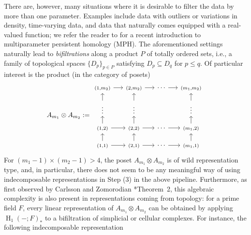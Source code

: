 \documentclass[a4paper]{amsart}
\theoremstyle{plain}
\theoremstyle{definition}
\theoremstyle{remark}
\begin{document}
There are, however, many situations where it is desirable to filter the data by more than one parameter. Examples include data with outliers or variations in density, time-varying data, and data that naturally comes equipped with a real-valued function; we refer the reader to \cite{botnan2022introduction} for a recent introduction to multiparameter persistent homology (MPH). The aforementioned settings naturally lead to \emph{bifiltrations} along a product $P$ of totally ordered sets, i.e., a family of topological spaces $\{D_p\}_{p\in P}$ satisfying $D_p\subseteq D_q$ for $p\leq q$. Of particular interest is the product (in the category of posets)
\[
A_{m_1}\otimes A_{m_2} :=
\begin{tikzcd}[row sep=4mm, column sep=5mm]
\scriptstyle (1, m_2) \ar[r] & \scriptstyle (2, m_2) \ar[r] &  \cdots\ar[r] & \scriptstyle (m_1, m_2) \\
\vdots \ar[u] & \vdots \ar[u] && \vdots \ar[u] \\
\scriptstyle (1,2) \ar[r]  \ar[u] & \scriptstyle (2,2) \ar[u]\ar[r] & \cdots \ar[r] & \scriptstyle (m_1, 2) \ar[u] \\
\scriptstyle (1,1) \ar[r]  \ar[u] & \scriptstyle (2,1) \ar[u]\ar[r] & \cdots \ar[r] & \scriptstyle (m_1, 1) \ar[u] 
\end{tikzcd}
\]
For
$(m_1-1) \times (m_2-1) > 4$, 
the poset
$A_{m_1}\otimes A_{m_2}$ 
is of wild representation type, and, in particular, there does not seem to be any meaningful way of using indecomposable representations in Step (3) in the above pipeline. Furthermore, as first observed by Carlsson and Zomorodian \cite{carlsson2007theory}*{Theorem~2}, this algebraic complexity is also present in representations coming from topology: for a prime field $F$, every linear representation of $A_{m_1}\otimes A_{m_2}$ can be obtained by applying $\operatorname{H}_1(-;F)_*$ to a bifiltration of simplicial or cellular complexes. For instance, the following indecomposable representation
\end{document}

